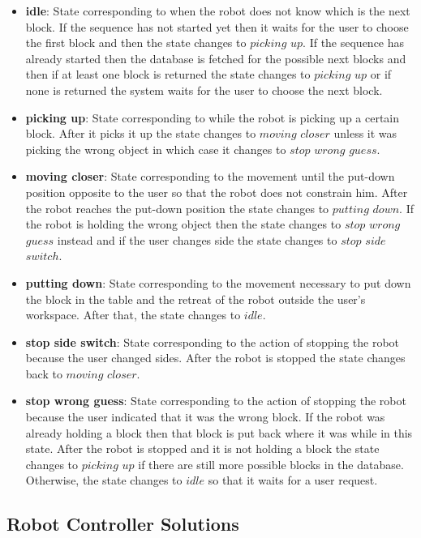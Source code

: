 \begin{itemize}
    \item \textbf{idle}: State corresponding to when the robot does not know which is the next block. If the sequence has not started yet then it waits for the user to choose the first block and then the state changes to $picking$ $up$. If the sequence has already started then the database is fetched for the possible next blocks and then if at least one block is returned the state changes to $picking$ $up$ or if none is returned the system waits for the user to choose the next block.
    \item \textbf{picking up}: State corresponding to while the robot is picking up a certain block. After it picks it up the state changes to $moving$ $closer$ unless it was picking the wrong object in which case it changes to $stop$ $wrong$ $guess$.
    \item \textbf{moving closer}: State corresponding to the movement until the put-down position opposite to the user so that the robot does not constrain him. After the robot reaches the put-down position the state changes to $putting$ $down$. If the robot is holding the wrong object then the state changes to $stop$ $wrong$ $guess$ instead and if the user changes side the state changes to $stop$ $side$ $switch$.
    \item \textbf{putting down}: State corresponding to the movement necessary to put down the block in the table and the retreat of the robot outside the user's workspace. After that, the state changes to $idle$.
    \item \textbf{stop side switch}: State corresponding to the action of stopping the robot because the user changed sides. After the robot is stopped the state changes back to $moving$ $closer$.
    \item \textbf{stop wrong guess}: State corresponding to the action of stopping the robot because the user indicated that it was the wrong block. If the robot was already holding a block then that block is put back where it was while in this state. After the robot is stopped and it is not holding a block the state changes to $picking$ $up$ if there are still more possible blocks in the database. Otherwise, the state changes to $idle$ so that it waits for a user request.
\end{itemize}

\subsection{Robot Controller Solutions}


